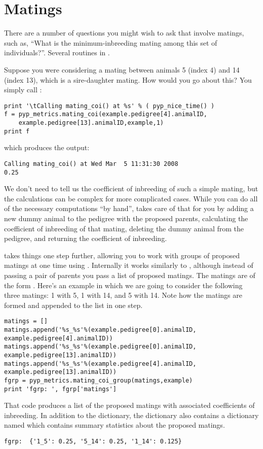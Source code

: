\section{Matings}\label{sec:computing-matings}
There are a number of questions you might wish to ask that involve matings, such as, ``What is the minimum-inbreeding mating among this set of individuals?''. Several routines in .

Suppose you were considering a mating between animals 5 (index 4) and 14 (index 13), which is a sire-daughter mating. How would you go about this? You simply call :
\begin{verbatim}
print '\tCalling mating_coi() at %s' % ( pyp_nice_time() )
f = pyp_metrics.mating_coi(example.pedigree[4].animalID,
    example.pedigree[13].animalID,example,1)
print f
\end{verbatim}
which produces the output:
\begin{verbatim}
Calling mating_coi() at Wed Mar  5 11:31:30 2008
0.25
\end{verbatim}
We don't need \PyPedal{} to tell us the coefficient of inbreeding of such a simple mating, but the calculations can be complex for more complicated cases. While you can do all of the necessary computations ``by hand'',  takes care of that for you by adding a new dummy animal to the pedigree with the proposed parents, calculating the coefficient of inbreeding of that mating, deleting the dummy animal from the pedigree, and returning the coefficient of inbreeding.

\PyPedal{} takes things one step further, allowing you to work with groups of proposed matings at one time using . Internally it works similarly to , although instead of passing a pair of parents you pass a list of proposed matings. The matings are of the form . Here's an example in which we are going to consider the following three matings: 1 with 5, 1 with 14, and 5 with 14. Note how the matings are formed and appended to the  list in one step.
\begin{verbatim}
matings = []
matings.append('%s_%s'%(example.pedigree[0].animalID, example.pedigree[4].animalID))
matings.append('%s_%s'%(example.pedigree[0].animalID, example.pedigree[13].animalID))
matings.append('%s_%s'%(example.pedigree[4].animalID, example.pedigree[13].animalID))
fgrp = pyp_metrics.mating_coi_group(matings,example)
print 'fgrp: ', fgrp['matings']
\end{verbatim}
That code produces a list of the proposed matings with associated coefficients of inbreeding. In addition to the  dictionary, the  dictionary also contains a dictionary named  which contains summary statistics about the proposed matings.
\begin{verbatim}
fgrp:  {'1_5': 0.25, '5_14': 0.25, '1_14': 0.125}
\end{verbatim}
